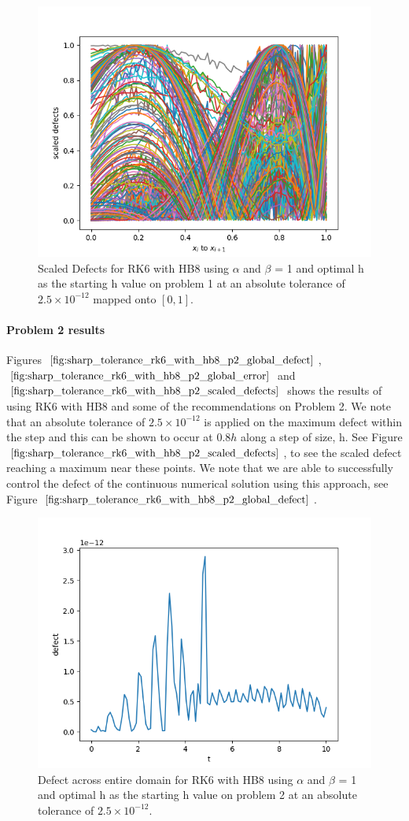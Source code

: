 \begin{figure}[H]
\centering
\includegraphics[width=0.7\linewidth]{./figures/sharp_tolerance_rk6_with_hb8_p1_scaled_defects}
\caption{Scaled Defects for RK6 with HB8 using $\alpha$ and $\beta$ = 1 and optimal h as the starting h value on problem 1 at an absolute tolerance of $2.5 \times 10^{-12}$ mapped onto $[0, 1]$.}
\label{fig:sharp_tolerance_rk6_with_hb8_p1_scaled_defects}
\end{figure}

\paragraph{Problem 2 results}
Figures $\ref{fig:sharp_tolerance_rk6_with_hb8_p2_global_defect}$, $\ref{fig:sharp_tolerance_rk6_with_hb8_p2_global_error}$ and $\ref{fig:sharp_tolerance_rk6_with_hb8_p2_scaled_defects}$ shows the results of using RK6 with HB8 and some of the recommendations on Problem 2. We note that an absolute tolerance of $2.5 \times 10^{-12}$ is applied on the maximum defect within the step and this can be shown to occur at $0.8h$ along a step of size, h. See Figure $\ref{fig:sharp_tolerance_rk6_with_hb8_p2_scaled_defects}$, to see the scaled defect reaching a maximum near these points. We note that we are able to successfully control the defect of the continuous numerical solution using this approach, see Figure $\ref{fig:sharp_tolerance_rk6_with_hb8_p2_global_defect}$. 
\begin{figure}[H]
\centering
\includegraphics[width=0.7\linewidth]{./figures/sharp_tolerance_rk6_with_hb8_p2_global_defect}
\caption{Defect across entire domain for RK6 with HB8 using $\alpha$ and $\beta$ = 1 and optimal h as the starting h value on problem 2 at an absolute tolerance of $2.5 \times 10^{-12}$.}
\label{fig:sharp_tolerance_rk6_with_hb8_p2_global_defect}
\end{figure}

